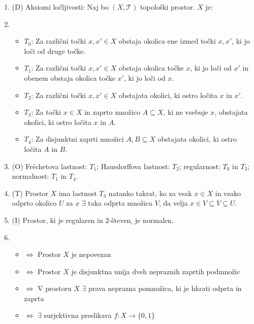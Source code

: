 \documentclass[10pt,a4paper]{article}
\newcommand{\TT}{\mathcal{T}}
\begin{document}
\begin{enumerate}
\item (D) Aksiomi ločljivosti: Naj bo $(X,\TT)$ topološki prostor. $X$ je: 
\item 
            \begin{itemize}
                \setlength\itemsep{-4px}
                \item $T_0$: Za različni točki $x,x'\in X$ obstaja okolica ene izmed točki $x,x'$, ki jo loči od druge točke.
                \item $T_1$: Za različni točki $x,x'\in X$ obstaja okolica točke $x$, ki jo loči od $x'$ in obenem obstaja okolica točke $x'$, ki jo loči od $x$.
                \item $T_2$: Za različni točki $x,x'\in X$ obstajata okolici, ki ostro ločita $x$ in $x'$.
                \item $T_3$: Za točki $x\in X$ in zaprto množico $A\subseteq X$, ki ne vsebuje $x$, obstajata okolici, ki ostro ločita $x$ in $A$.
                \item $T_4$: Za disjunktni zaprti množici $A,B\subseteq X$ obstajata okolici, ki ostro ločita $A$ in $B$.
            \end{itemize}
            
\item (O) Fréchetova lastnost: $T_1$; Hausdorffova lastnost: $T_2$; regularnost: $T_0$ in $T_3$; normalnost: $T_1$ in $T_4$.
            
\item (T) Prostor $X$ ima lastnost $T_3$ natanko takrat, ko za vsak $x\in X$ in vsako odprto okolico $U$ za $x$ $\exists$ taka odprta množica $V$, da velja $x\in V\subseteq \overline{V}\subseteq U$.
            
\item (I) Prostor, ki je regularen in $2$-števen, je normalen.
            
\item 
\begin{itemize}[label={}]
    \setlength\itemsep{-4px}
    \item \(\iff\) Prostor $X$ je nepovezan
    \item \(\iff\) Prostor $X$ je disjunktna unija dveh nepraznih zaprtih podmnožic
    \item \(\iff\) V prostoru $X$ $\exists$ prava neprazna pomnožica, ki je hkrati odprta in zaprta
    \item \(\iff\) $\exists$ surjektivna preslikava $f:X\to\{0,1\}$
\end{itemize}
            

\end{enumerate}
\end{document}
